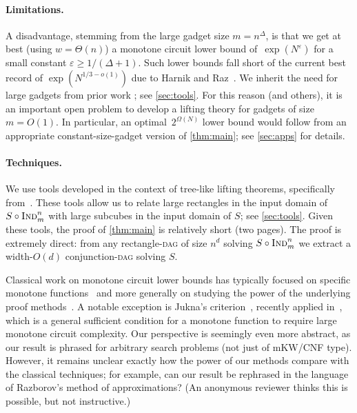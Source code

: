 \documentclass{toc}
\newcommand{\Ind}{\textsc{Ind}}
\newcommand{\DAGspace}{\textsc{dag}\xspace}
\begin{document}
\paragraph{Limitations.}
A disadvantage, stemming from the large gadget size $m=n^\Delta$, is that we get at best (using $w=\Theta(n)$) a monotone circuit lower bound of~$\exp(N^{\varepsilon})$ for a small constant $\varepsilon\geq 1/(\Delta+1)$. Such lower bounds fall short of the current best record of $\exp(N^{1/3-o(1)})$ due to Harnik and Raz~\cite{harnik00higher}. We inherit the need for large gadgets from prior work \cite{goos16rectangles,goos17bpp}; see \autoref{sec:tools}. For this reason (and others), it is an important open problem to develop a lifting theory for gadgets of size $m=O(1)$. In particular, an optimal~$2^{\Omega(N)}$ lower bound would follow from an appropriate constant-size-gadget version of \autoref{thm:main}; see \autoref{sec:apps} for details.


\paragraph{Techniques.}
We use tools developed in the context of tree-like lifting theorems, specifically from~\cite{goos16rectangles,goos17bpp}. These tools allow us to relate large rectangles in the input domain of $S\circ\Ind_m^n$ with large subcubes in the input domain of $S$; see \autoref{sec:tools}. Given these tools, the proof of \autoref{thm:main} is relatively short (two pages). The proof is extremely direct: from any rectangle-\DAGspace of size $n^d$ solving $S\circ \Ind^n_m$ we extract a width-$O(d)$ conjunction-\DAGspace solving $S$.

Classical
%
work     %
on monotone circuit lower bounds
%
has      %
typically focused on specific monotone functions~\cite{razborov85monlower,andreev1985monlower,alon87monlower,haken95bottleneck,rossman14monotone} and more generally on studying the power of the underlying proof methods~\cite{razborov89onthemethod,wigderson93thefusion,razborov97generalapprox,simon97approxbottle,berg99approxbottle,amano04approxbottle}. A notable exception is Jukna's criterion~\cite{jukna97finitelimits}, recently applied in~\cite{hrubes17randomformulas,fleming17randomcnf}, which is a general sufficient condition for a monotone function to require large monotone circuit complexity. Our perspective is seemingly even more abstract, as our result is phrased for arbitrary search problems (not just of mKW/CNF type). However, it remains unclear exactly how the power of our methods compare with the classical techniques; for example, can our result be rephrased in the language of Razborov's method of approximations? (An anonymous reviewer thinks this is possible, but not instructive.)
\end{document}
